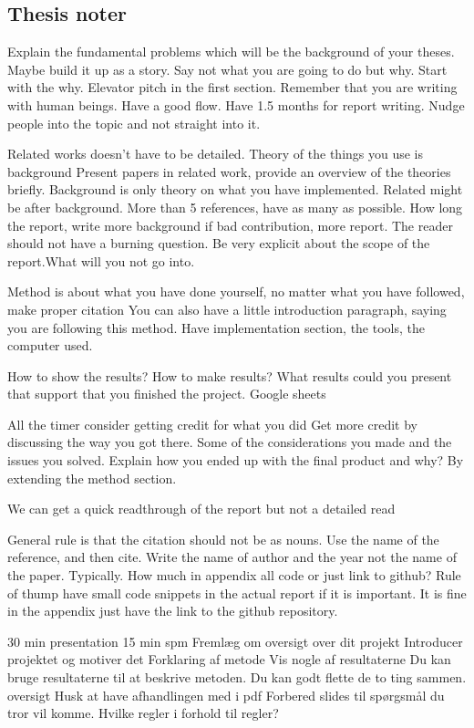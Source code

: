 \subsection{Thesis noter}
Explain the fundamental problems which will be the background of your theses.
Maybe build it up as a story.
Say not what you are going to do but why.
Start with the why. Elevator pitch in the first section.
Remember that you are writing with human beings. Have a good flow. Have 1.5 months for report writing.
Nudge people into the topic and not straight into it.

Related works doesn't have to be detailed.
Theory of the things you use is background
Present papers in related work, provide an overview of the theories briefly.
Background is only theory on what you have implemented.
Related might be after background.
More than 5 references, have as many as possible.
How long the report, write more background if bad contribution, more report.
The reader should not have a burning question.
Be very explicit about the scope of the report.What will you not go into.

Method is about what you have done yourself, no matter what you have followed, make proper citation 
You can also have a little introduction paragraph, saying you are following this method.
Have implementation section, the tools, the computer used.

How to show the results?
How to make results?
What results could you present that support that you finished the project.
Google sheets

All the timer consider getting credit for what you did
Get more credit by discussing the way you got there. Some of the considerations you made and the issues you solved.
Explain how you ended up with the final product and why?
By extending the method section.

We can get a quick readthrough of the report but not a detailed read

General rule is that the citation should not be as nouns.
Use the name of the reference, and then cite.
Write the name of author and the year not the name of the paper. Typically.
How much in appendix all code or just link to github?
Rule of thump have small code snippets in the actual report if it is important. It is fine in the appendix just have the link to the github repository.

30 min presentation
15 min spm 
Fremlæg om oversigt over dit projekt
Introducer projektet og motiver det
Forklaring af metode
Vis nogle af resultaterne 
Du kan bruge resultaterne til at beskrive metoden.
Du kan godt flette de to ting sammen.
oversigt
Husk at have afhandlingen med i pdf
Forbered slides til spørgsmål du tror vil komme.
Hvilke regler i forhold til regler? 

